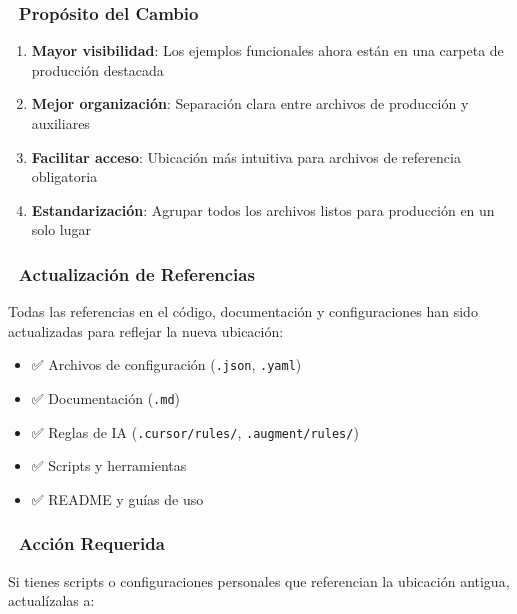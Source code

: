 \documentclass[
]{article}
\providecommand{\tightlist}{%
  \setlength{\itemsep}{0pt}\setlength{\parskip}{0pt}}
\begin{document}
\subsubsection{\texorpdfstring{🎯 \textbf{Propósito del
Cambio}}{🎯 Propósito del Cambio}}\label{propuxf3sito-del-cambio}

\begin{enumerate}
\def\labelenumi{\arabic{enumi}.}
\tightlist
\item
  \textbf{Mayor visibilidad}: Los ejemplos funcionales ahora están en
  una carpeta de producción destacada
\item
  \textbf{Mejor organización}: Separación clara entre archivos de
  producción y auxiliares
\item
  \textbf{Facilitar acceso}: Ubicación más intuitiva para archivos de
  referencia obligatoria
\item
  \textbf{Estandarización}: Agrupar todos los archivos listos para
  producción en un solo lugar
\end{enumerate}

\subsubsection{\texorpdfstring{📝 \textbf{Actualización de
Referencias}}{📝 Actualización de Referencias}}\label{actualizaciuxf3n-de-referencias}

Todas las referencias en el código, documentación y configuraciones han
sido actualizadas para reflejar la nueva ubicación:

\begin{itemize}
\tightlist
\item
  ✅ Archivos de configuración (\texttt{.json}, \texttt{.yaml})
\item
  ✅ Documentación (\texttt{.md})
\item
  ✅ Reglas de IA (\texttt{.cursor/rules/}, \texttt{.augment/rules/})
\item
  ✅ Scripts y herramientas
\item
  ✅ README y guías de uso
\end{itemize}

\subsubsection{\texorpdfstring{🔧 \textbf{Acción
Requerida}}{🔧 Acción Requerida}}\label{acciuxf3n-requerida}

Si tienes scripts o configuraciones personales que referencian la
ubicación antigua, actualízalas a:
\end{document}
